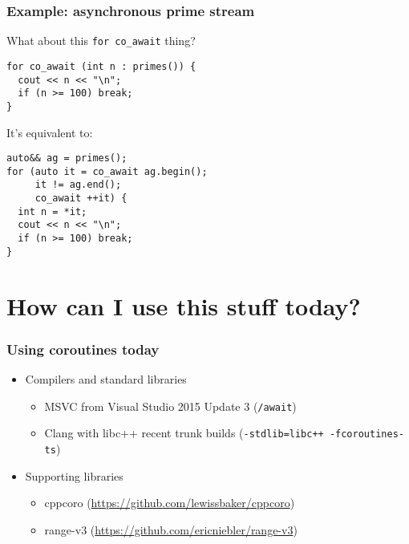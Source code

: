 \documentclass[aspectratio=43]{beamer}
\begin{document}
\begin{frame}[fragile]
  \frametitle{Example: asynchronous prime stream}
  What about this \lstinline~for co_await~ thing?
\begin{lstlisting}
for co_await (int n : primes()) {
  cout << n << "\n";
  if (n >= 100) break;
}
\end{lstlisting}
  \pause
  It's equivalent to:
\begin{lstlisting}
auto&& ag = primes();
for (auto it = co_await ag.begin();
     it != ag.end();
     co_await ++it) {
  int n = *it;
  cout << n << "\n";
  if (n >= 100) break;
}
\end{lstlisting}
\end{frame}

\section{How can I use this stuff today?}

\begin{frame}[fragile]
  \frametitle{Using coroutines today}
  \begin{itemize}
  \item Compilers and standard libraries
    \begin{itemize}
    \item MSVC from Visual Studio 2015 Update 3 (\texttt{/await})
    \item Clang with libc++ recent trunk builds (\texttt{-stdlib=libc++ -fcoroutines-ts})
    \end{itemize}
  \item Supporting libraries
    \begin{itemize}
    \item cppcoro (\url{https://github.com/lewissbaker/cppcoro})
    \item range-v3 (\url{https://github.com/ericniebler/range-v3})
    \end{itemize}
  \end{itemize}
\end{frame}
\end{document}
